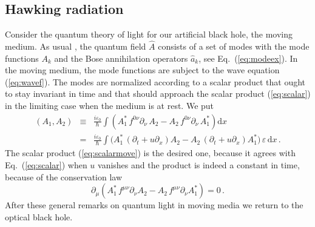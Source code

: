 \documentclass[12pt,amsmath,amssymb]{article}
\numberwithin{equation}{section}
\begin{document}
\subsection{Hawking radiation}

Consider the quantum theory of light for our artificial black hole,
the moving medium.
As usual \cite{Birrell,Weinberg},
the quantum field $\hat{A}$ consists of a set of modes
with the mode functions $A_k$ and the Bose annihilation
operators $\hat{a}_k$, see Eq.\  (\ref{eq:modeex}).
In the moving medium, the mode functions are subject
to the wave equation (\ref{eq:wavef}).
The modes are normalized according to a scalar product
that ought to stay invariant in time and that should approach the
scalar product (\ref{eq:scalar}) in the limiting case when
the medium is at rest. We put
\begin{eqnarray}
\left(A_1,A_2\right) &\equiv&
\frac{i\varepsilon_0}{\hbar}
\int \left(A_1^*\,f^{0\nu}\partial_\nu\, A_2 -
A_2 \,f^{0\nu}\partial_\nu \,A_1^*\right)
\mathrm{d}x
\nonumber\\
&=&
\frac{i\varepsilon_0}{\hbar}
\int \Big(A_1^*\,(\partial_t + u\partial_x) A_2 -
A_2 \,(\partial_t + u\partial_x)A_1^*\Big) \,\varepsilon\,
\mathrm{d}x \,.
\label{eq:scalarmove}
\end{eqnarray}
The scalar product (\ref{eq:scalarmove}) is the desired one,
because it agrees with Eq.\  (\ref{eq:scalar}) when $u$ vanishes
and the product is indeed a constant in time,
because of the conservation law
\begin{equation}
\label{eq:consmove}
\partial_\mu \left(A_1^*\, f^{\mu\nu} \partial_\nu A_2 -
A_2\, f^{\mu\nu} \partial_\nu A_1^*\right) = 0 \,.
\end{equation}
After these general remarks on quantum light in moving media
we return to the optical black hole.
\end{document}
